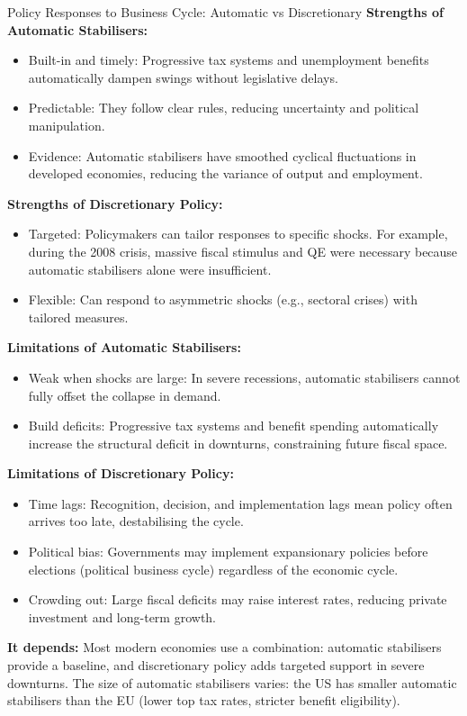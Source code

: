 \documentclass[11pt, a4paper, twoside]{book}
\begin{document}
\begin{evaluation}{Policy Responses to Business Cycle: Automatic vs Discretionary}
\textbf{Strengths of Automatic Stabilisers:}
\begin{itemize}
  \item Built-in and timely: Progressive tax systems and unemployment benefits automatically dampen swings without legislative delays.
  \item Predictable: They follow clear rules, reducing uncertainty and political manipulation.
  \item Evidence: Automatic stabilisers have smoothed cyclical fluctuations in developed economies, reducing the variance of output and employment.
\end{itemize}

\textbf{Strengths of Discretionary Policy:}
\begin{itemize}
  \item Targeted: Policymakers can tailor responses to specific shocks. For example, during the 2008 crisis, massive fiscal stimulus and QE were necessary because automatic stabilisers alone were insufficient.
  \item Flexible: Can respond to asymmetric shocks (e.g., sectoral crises) with tailored measures.
\end{itemize}

\textbf{Limitations of Automatic Stabilisers:}
\begin{itemize}
  \item Weak when shocks are large: In severe recessions, automatic stabilisers cannot fully offset the collapse in demand.
  \item Build deficits: Progressive tax systems and benefit spending automatically increase the structural deficit in downturns, constraining future fiscal space.
\end{itemize}

\textbf{Limitations of Discretionary Policy:}
\begin{itemize}
  \item Time lags: Recognition, decision, and implementation lags mean policy often arrives too late, destabilising the cycle.
  \item Political bias: Governments may implement expansionary policies before elections (political business cycle) regardless of the economic cycle.
  \item Crowding out: Large fiscal deficits may raise interest rates, reducing private investment and long-term growth.
\end{itemize}

\textbf{It depends:}
Most modern economies use a combination: automatic stabilisers provide a baseline, and discretionary policy adds targeted support in severe downturns. The size of automatic stabilisers varies: the US has smaller automatic stabilisers than the EU (lower top tax rates, stricter benefit eligibility).
\end{evaluation}
\end{document}

